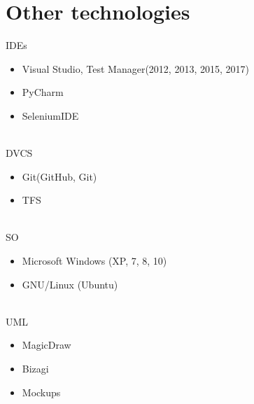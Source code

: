 \documentclass[letterpaper]{twentysecondcv} %
\begin{document}
\section{Other technologies}
\begin{twenty}
	
	\twentyitem
    	{IDEs}
		{}
        {}
        {}
        {}
        {
        {\begin{itemize}
        \item Visual Studio, Test Manager(2012, 2013, 2015, 2017)
        \item PyCharm
        \item SeleniumIDE
		\end{itemize}}
        }
        \\
        \twentyitem
    	{DVCS}
		{}
        {}
        {}
        {}
        {
        {\begin{itemize}
        \item Git(GitHub, Git)
        \item TFS
		\end{itemize}}
		}
		\\
        \twentyitem
	    {SO}
		{}
        {}
        {}
        {}
        {
        {\begin{itemize}
        \item Microsoft Windows (XP, 7, 8, 10)
        \item GNU/Linux (Ubuntu)
		\end{itemize}}
		}
		\\
        \twentyitem
	    {UML}
		{}
        {}
        {}
        {}
        {
        {\begin{itemize}
        \item MagicDraw
        \item Bizagi
        \item Mockups
		\end{itemize}}
		}
\end{twenty}
\end{document}
